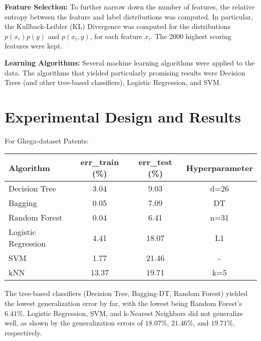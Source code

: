 \documentclass[twoside,11pt]{article}
\renewcommand{\>}{{\rightarrow}}
\newcommand{\1}{{\mathbf 1}}
\newcommand{\0}{{\mathbf 0}}
\begin{document}
\textbf{Feature Selection:} To further narrow down the number of features, the relative entropy between the feature and label distributions was computed. In particular, the Kullback-Leibler (KL) Divergence was computed for the distributions $p(x_i)p(y)$ and $p(x_i, y)$, for each feature $x_i$. The 2000 highest scoring features were kept.

\textbf{Learning Algorithms:} Several machine learning algorithms were applied to the data. The algorithms that yielded particularly promising results were Decision Trees (and other tree-based classifiers), Logistic Regression, and SVM.


\section{Experimental Design and Results}
For Ghega-dataset Patents:
\begin{center}
    \begin{tabular}{|l|c|c|c|}
    \hline
    \textbf{Algorithm}     & \textbf{err\_train (\%)} & \textbf{err\_test (\%)} & \textbf{Hyperparameter} \\
    \hline
    Decision Tree          & 3.04   & 9.03    & d=26  \\
    \hline
    Bagging                & 0.05   & 7.09    & DT \\
    \hline
    Random Forest          & 0.04   & 6.41    & n=31  \\
    \hline
    Logistic Regression    & 4.41   & 18.07   & L1    \\
    \hline
    SVM                    & 1.77   & 21.46   & -   \\
    \hline  
    kNN                    & 13.37   & 19.71   & k=5   \\
    \hline  
    \end{tabular}
\end{center}

The tree-based classifiers (Decision Tree, Bagging-DT, Random Forest) yielded the lowest generalization error by far, with the lowest being Random Forest's $6.41\%$. Logistic Regression, SVM, and k-Nearest Neighbors did not generalize well, as shown by the generalization errors of $18.07\%$, $21.46\%$, and $19.71\%$, respectively. \\
\end{document}
